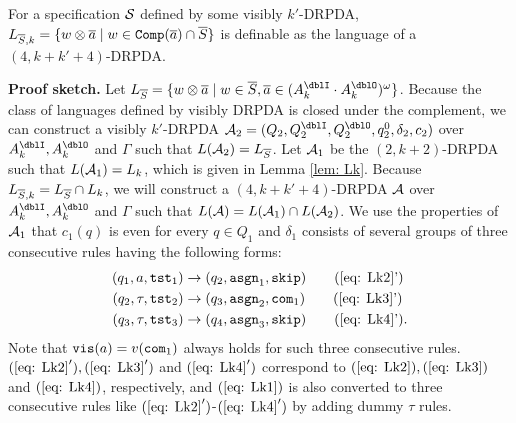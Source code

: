 \begin{lemma}\label{lem: LkS}
For a specification ${\cal S}$ defined by some visibly $k'$-DRPDA,
$L_{{\overline{S}}, k} = \{w\otimes{\overline{a}} \mid w\in{\mathtt{Comp}}({\overline{a}})\cap {\overline{S}}\}$
is definable as the language of a $(4,k+k'+4)$-DRPDA.
\end{lemma}
{\bf Proof sketch.}\quad
Let $L_{\overS} = \{w\otimes\overa\mid w\in\overS, \overa\in(A_k^\dblI\cdot A_k^\dblO)^\omega\}$.
Because the class of languages defined by visibly DRPDA is closed under the complement,
we can construct a visibly $k'$-DRPDA
$\calA_2=(Q_2, Q^\dblI_2, Q^\dblO_2, q^0_2, \delta_2, c_2)$
over $A^\dblI_{k}, A^\dblO_{k}$ and $\Gamma$
such that $L({\cal A}_2)= L_{{\overline{S}}}$.
Let ${\cal A}_1$ be the $(2,k+2)$-DRPDA
such that $L({\cal A}_1)=L_k$, which is given in Lemma \ref{lem: Lk}.
Because $L_{{\overline{S}}, k} = L_{{\overline{S}}} \cap L_k$, we will construct a $(4,k+k'+4)$-DRPDA ${\cal A}$
over $A^\dblI_{k}, A^\dblO_{k}$ and $\Gamma$
such that $L({\cal A})=L({\cal A}_1)\cap L({\cal A}_2)$.
We use the properties of ${\cal A}_1$ that
$c_1(q)$ is even for every $q\in Q_1$ and
$\delta_1$ consists of several groups of three consecutive rules having the following forms:
\begin{align}
(q_1, a, \tst_1) &\to (q_2,\asgn_1, \skip) \tag{\ref{eq: Lk2}'}\\
(q_2, \tau, \tst_2) &\to (q_3,\asgn_2, \com_1) \tag{\ref{eq: Lk3}'}\\
(q_3, \tau, \tst_3) &\to (q_4,\asgn_3, \skip) \tag{\ref{eq: Lk4}'}.
\end{align}
Note that $\mathtt{vis}(a)=v(\mathtt{com}_1)$ always holds for such three consecutive rules.
$(\ref{eq: Lk2}'), (\ref{eq: Lk3}')$ and $(\ref{eq: Lk4}')$ correspond to $(\ref{eq: Lk2}), (\ref{eq: Lk3})$ and $(\ref{eq: Lk4})$, respectively, and $(\ref{eq: Lk1})$
is also converted to three consecutive rules like $(\ref{eq: Lk2}')$-$(\ref{eq: Lk4}')$
by adding dummy $\tau$ rules.

